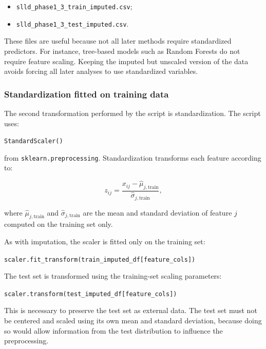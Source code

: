 \documentclass{ipgpmaster}
\begin{document}
\begin{itemize}
    \item \texttt{slld\_phase1\_3\_train\_imputed.csv};
    \item \texttt{slld\_phase1\_3\_test\_imputed.csv}.
\end{itemize}

These files are useful because not all later methods require standardized predictors. For instance, tree-based models such as Random Forests do not require feature scaling. Keeping the imputed but unscaled version of the data avoids forcing all later analyses to use standardized variables.

\subsubsection{Standardization fitted on training data}

The second transformation performed by the script is standardization. The script uses:

\begin{center}
\texttt{StandardScaler()}
\end{center}

from \texttt{sklearn.preprocessing}. Standardization transforms each feature according to:

\[
z_{ij} = \frac{x_{ij} - \hat{\mu}_{j,\text{train}}}{\hat{\sigma}_{j,\text{train}}},
\]

where \(\hat{\mu}_{j,\text{train}}\) and \(\hat{\sigma}_{j,\text{train}}\) are the mean and standard deviation of feature \(j\) computed on the training set only.

As with imputation, the scaler is fitted only on the training set:

\begin{center}
\texttt{scaler.fit\_transform(train\_imputed\_df[feature\_cols])}
\end{center}

The test set is transformed using the training-set scaling parameters:

\begin{center}
\texttt{scaler.transform(test\_imputed\_df[feature\_cols])}
\end{center}

This is necessary to preserve the test set as external data. The test set must not be centered and scaled using its own mean and standard deviation, because doing so would allow information from the test distribution to influence the preprocessing.
\end{document}

